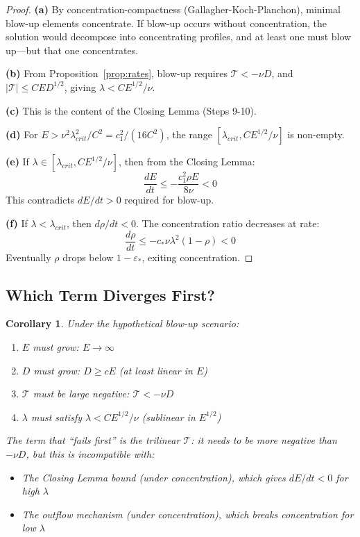 \documentclass[11pt]{article}
\newtheorem{corollary}[theorem]{Corollary}
\theoremstyle{definition}
\begin{document}
\begin{proof}
\textbf{(a)} By concentration-compactness (Gallagher-Koch-Planchon), minimal blow-up elements concentrate. If blow-up occurs without concentration, the solution would decompose into concentrating profiles, and at least one must blow up---but that one concentrates.

\textbf{(b)} From Proposition~\ref{prop:rates}, blow-up requires $\mathcal{T} < -\nu D$, and $|\mathcal{T}| \leq CED^{1/2}$, giving $\lambda < CE^{1/2}/\nu$.

\textbf{(c)} This is the content of the Closing Lemma (Steps 9-10).

\textbf{(d)} For $E > \nu^2\lambda_{crit}^2/C^2 = c_1^2/(16C^2)$, the range $[\lambda_{crit}, CE^{1/2}/\nu]$ is non-empty.

\textbf{(e)} If $\lambda \in [\lambda_{crit}, CE^{1/2}/\nu]$, then from the Closing Lemma:
\[
\frac{dE}{dt} \leq -\frac{c_1^2\rho E}{8\nu} < 0
\]
This contradicts $dE/dt > 0$ required for blow-up.

\textbf{(f)} If $\lambda < \lambda_{crit}$, then $d\rho/dt < 0$. The concentration ratio decreases at rate:
\[
\frac{d\rho}{dt} \leq -c_*\nu\lambda^2(1-\rho) < 0
\]
Eventually $\rho$ drops below $1 - \varepsilon_*$, exiting concentration.
\end{proof}

\subsection{Which Term Diverges First?}

\begin{corollary}
Under the hypothetical blow-up scenario:
\begin{enumerate}
\item $E$ must grow: $E \to \infty$
\item $D$ must grow: $D \geq cE$ (at least linear in $E$)
\item $\mathcal{T}$ must be large negative: $\mathcal{T} < -\nu D$
\item $\lambda$ must satisfy $\lambda < CE^{1/2}/\nu$ (sublinear in $E^{1/2}$)
\end{enumerate}

The term that ``fails first'' is the trilinear $\mathcal{T}$: it needs to be more negative than $-\nu D$, but this is incompatible with:
\begin{itemize}
\item The Closing Lemma bound (under concentration), which gives $dE/dt < 0$ for high $\lambda$
\item The outflow mechanism (under concentration), which breaks concentration for low $\lambda$
\end{itemize}
\end{corollary}
\end{document}
